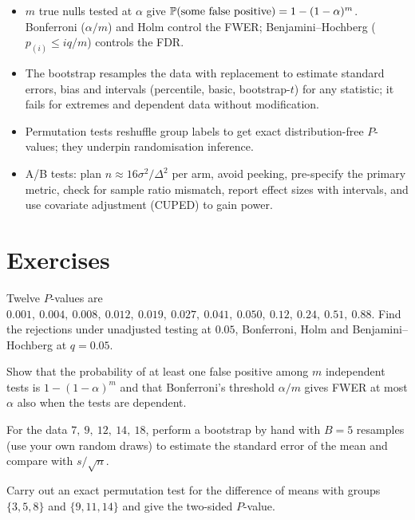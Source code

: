 \begin{summarybox}
\begin{itemize}
  \item $m$ true nulls tested at $\alpha$ give $\mathbb{P}(\text{some false positive})=1-(1-\alpha)^m$. Bonferroni ($\alpha/m$) and Holm control the FWER; Benjamini--Hochberg ($p_{(i)}\le iq/m$) controls the FDR.
  \item The bootstrap resamples the data with replacement to estimate standard errors, bias and intervals (percentile, basic, bootstrap-$t$) for any statistic; it fails for extremes and dependent data without modification.
  \item Permutation tests reshuffle group labels to get exact distribution-free $P$-values; they underpin randomisation inference.
  \item A/B tests: plan $n\approx16\sigma^2/\Delta^2$ per arm, avoid peeking, pre-specify the primary metric, check for sample ratio mismatch, report effect sizes with intervals, and use covariate adjustment (CUPED) to gain power.
\end{itemize}
\end{summarybox}

\section{Exercises}

\begin{exercise}
Twelve $P$-values are $0.001,\ 0.004,\ 0.008,\ 0.012,\ 0.019,\ 0.027,\ 0.041,\ 0.050,\ 0.12,\ 0.24,\ 0.51,\ 0.88$. Find the rejections under unadjusted testing at $0.05$, Bonferroni, Holm and Benjamini--Hochberg at $q=0.05$.
\end{exercise}

\begin{exercise}
Show that the probability of at least one false positive among $m$ independent tests is $1-(1-\alpha)^m$ and that Bonferroni's threshold $\alpha/m$ gives FWER at most $\alpha$ also when the tests are dependent.
\end{exercise}

\begin{exercise}
For the data $7,\ 9,\ 12,\ 14,\ 18$, perform a bootstrap by hand with $B=5$ resamples (use your own random draws) to estimate the standard error of the mean and compare with $s/\sqrt n$.
\end{exercise}

\begin{exercise}
Carry out an exact permutation test for the difference of means with groups $\{3,5,8\}$ and $\{9,11,14\}$ and give the two-sided $P$-value.
\end{exercise}

